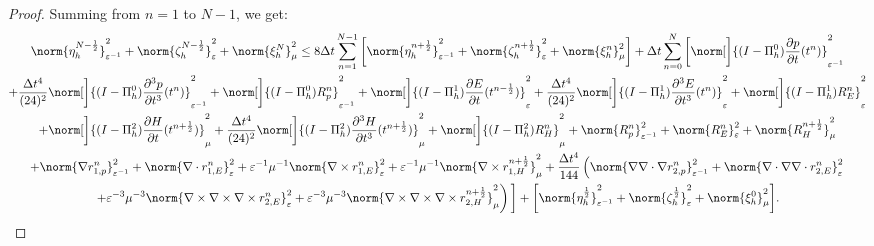 \documentclass{amsart}
\theoremstyle{thmstyleone}%
\theoremstyle{thmstyletwo}%
\theoremstyle{thmstylethree}%
\begin{document}
\begin{proof}
Summing from $n = 1$ to $N-1$, we get:
\begin{multline*}
  \norm{\eta_h^{N - \frac{1}{2}}}^2_{\varepsilon^{-1}} + \norm{\zeta_h^{N - \frac{1}{2}}}^2_{\varepsilon} + \norm{\xi_h^N}^2_{\mu} \le 8 \Delta t \sum\limits_{n = 1}^{N-1} \bigg[ \norm{\eta_h^{n + \frac{1}{2}}}^2_{\varepsilon^{-1}} +\norm{\zeta_h^{n + \frac{1}{2}}}^2_{\varepsilon} + \norm{\xi_h^n}^2_{\mu} \bigg] + \Delta t \sum\limits_{n = 0}^{N} \bigg[ \norm[\bigg]{(I - \Pi_h^0) \dfrac{\partial p}{\partial t}(t^n)}^2_{\varepsilon^{-1}} \\ + \dfrac{\Delta t^4}{(24)^2} \norm[\bigg]{(I - \Pi_h^0) \dfrac{\partial^3 p}{\partial t^3}(t^n)}^2_{\varepsilon^{-1}} + 
  \norm[\bigg]{(I - \Pi_h^0) R_p^n}^2_{\varepsilon^{-1}} + \norm[\bigg]{(I - \Pi_h^1) \dfrac{\partial E}{\partial t}(t^{n - \frac{1}{2}})}^2_{\varepsilon}  + \dfrac{\Delta t^4}{(24)^2} \norm[\bigg]{(I - \Pi_h^1) \dfrac{\partial^3 E}{\partial t^3}(t^n)}^2_{\varepsilon} + \norm[\bigg]{(I - \Pi_h^1) R_E^n}^2_{\varepsilon} \\ + \norm[\bigg]{(I - \Pi_h^2) \dfrac{\partial H}{\partial t}(t^{n + \frac{1}{2}})}^2_\mu + \dfrac{\Delta t^4}{(24)^2} \norm[\bigg]{(I - \Pi_h^2) \dfrac{\partial^3 H}{\partial t^3}(t^{n + \frac{1}{2}})}^2_{\mu}  + \norm[\bigg]{(I - \Pi_h^2) R_H^n}^2_\mu  + \norm{R_p^n}^2_{\varepsilon^{-1}} + \norm{R_E^n}^2_{\varepsilon} + \norm{R_H^{n + \frac{1}{2}}}^2_{\mu} \\ + \norm{\nabla r_{1,p}^n} ^2_{\varepsilon^{-1}} + \norm{\nabla \cdot r_{1,E}^n}^2_{\varepsilon} + \varepsilon^{-1} \mu^{-1} \norm{\nabla \times r_{1,E}^n}^2_{\varepsilon} +  \varepsilon^{-1} \mu^{-1} \norm{\nabla \times r_{1,H}^{n + \frac{1}{2}}}^2_{\mu} 
+  \dfrac{\Delta t^4}{144} \left( \norm{\nabla \nabla \cdot \nabla r_{2,p}^n} ^2_{\varepsilon^{-1}} + \norm{\nabla \cdot \nabla \nabla \cdot r_{2,E}^n}^2_{\varepsilon} \right. \\ 
\left. + \varepsilon^{-3} \mu^{-3} \norm{\nabla \times \nabla \times \nabla \times r_{2,E}^n}^2_{\varepsilon} +  \varepsilon^{-3} \mu^{-3} \norm{\nabla \times \nabla \times \nabla \times r_{2,H}^{n + \frac{1}{2}}}^2_{\mu} \right)  \bigg] + \bigg[ \norm{\eta_h^\frac{1}{2}}^2_{\varepsilon^{-1}} + \norm{\zeta_h^\frac{1}{2}}^2_{\varepsilon} + \norm{\xi_h^0}^2_{\mu} \bigg].
\end{multline*}


\end{proof}
\end{document}
